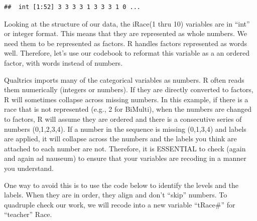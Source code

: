 \documentclass[
  11pt,
]{book}
\newenvironment{Shaded}{\begin{snugshade}}{\end{snugshade}}
\newcommand{\FunctionTok}[1]{\textcolor[rgb]{0.00,0.00,0.00}{#1}}
\newcommand{\NormalTok}[1]{#1}
\newcommand{\SpecialCharTok}[1]{\textcolor[rgb]{0.00,0.00,0.00}{#1}}
\begin{document}
\begin{Shaded}
\end{Shaded}

\begin{verbatim}
##  int [1:52] 3 3 3 3 1 3 3 3 1 0 ...
\end{verbatim}

Looking at the structure of our data, the iRace(1 thru 10) variables are in ``int'' or integer format. This means that they are represented as whole numbers. We need them to be represented as factors. R handles factors represented as words well. Therefore, let's use our codebook to reformat this variable as a an ordered factor, with words instead of numbers.

Qualtrics imports many of the categorical variables as numbers. R often reads them numerically (integers or numbers). If they are directly converted to factors, R will sometimes collapse across missing numbers. In this example, if there is a race that is not represented (e.g., 2 for BiMulti), when the numbers are changed to factors, R will assume they are ordered and there is a consecutive series of numbers (0,1,2,3,4). If a number in the sequence is missing (0,1,3,4) and labels are applied, it will collapse across the numbers and the labels you think are attached to each number are not. Therefore, it is ESSENTIAL to check (again and again ad nauseum) to ensure that your variables are recoding in a manner you understand.

One way to avoid this is to use the code below to identify the levels and the labels. When they are in order, they align and don't ``skip'' numbers. To quadruple check our work, we will recode into a new variable ``tRace\#'' for ``teacher'' Race.
\end{document}
